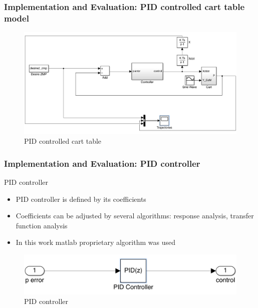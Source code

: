 \documentclass{beamer}
\begin{document}

	\begin{frame}
		\frametitle{Implementation and Evaluation: PID controlled cart table model}
		\begin{figure}[h!]
			\centering
			\includegraphics[width=\linewidth]{presentation_images/19}
			\caption{PID controlled cart table}
		\end{figure}
	\end{frame}


	\begin{frame}
		\frametitle{Implementation and Evaluation: PID controller}
		\begin{block}{PID controller}
			\begin{itemize}
				\item
					PID controller is defined by its coefficients
				\item
					Coefficients can be adjusted by several algorithms: response analysis, transfer function analysis
				\item 
					In this work matlab proprietary algorithm was used 
			\end{itemize}
		\end{block}
		
		\begin{figure}[h!]
			\centering
			\includegraphics[width=\linewidth]{presentation_images/20}
			\caption{PID controller}
		\end{figure}
	\end{frame}
	
\end{document}

